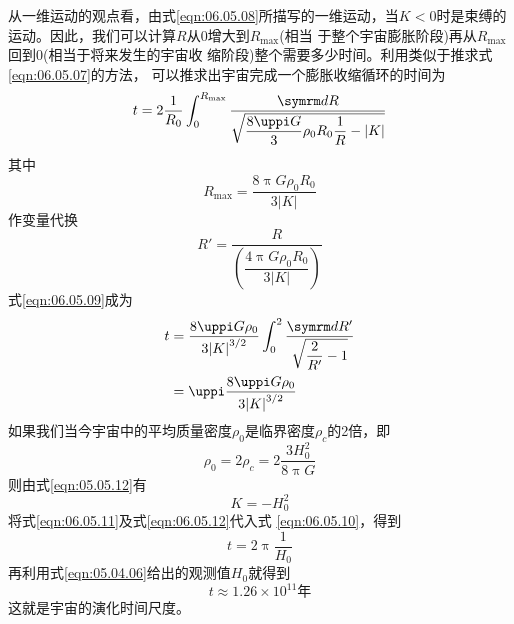 从一维运动的观点看，由式\eqref{eqn:06.05.08}所描写的一维运动，当$ K
  <0 $时是束缚的运动。因此，我们可以计算$ R $从0增大到$ R_{\max} $(相当
于整个宇宙膨胀阶段)再从$ R_{\max} $回到0(相当于将来发生的宇宙收
缩阶段)整个需要多少时间。利用类似于推求式\eqref{eqn:06.05.07}的方法，
可以推求出宇宙完成一个膨胀收缩循环的时间为
\begin{equation}\label{eqn:06.05.09}
  t = 2 \frac { 1 } { R _ { 0 } } \int _ 0 ^ { R _ { \max } } \frac { \dif R } { \sqrt { \dfrac { 8 \uppi G } { 3 } \rho _ { 0 } R _ { 0 } \dfrac { 1 } { R } - | K | } }
\end{equation}
其中
\begin{equation*}
  R _ { \max } = \frac { 8 \uppi G \rho _ { 0 } R _ { 0 } } { 3 | K | }
\end{equation*}
作变量代换
\begin{equation*}
  R ' = \frac { R } { \left( \dfrac { 4 \uppi G \rho _ { 0 } R _ { 0 } } { 3 | K | } \right) }
\end{equation*}
式\eqref{eqn:06.05.09}成为
\begin{equation}\label{eqn:06.05.10}
  \begin{aligned}
    t & = \frac { 8 \uppi G \rho _ { 0 } } { 3 { | K | } ^ { 3 / 2 } } \int _ { 0 } ^ { 2 } \frac { \dif R ' } { \sqrt { \dfrac { 2 } { R ' } - 1 } } \\
      & = \uppi \frac { 8 \uppi G \rho _ { 0 } } { 3 { | K | } ^ { 3 / 2 } }
  \end{aligned}
\end{equation}
如果我们当今宇宙中的平均质量密度$ \rho _ 0 $是临界密度$ \rho _ c $的2倍，即
\begin{equation}\label{eqn:06.05.11}
  \rho _ { 0 } = 2 \rho _ { c } = 2 \frac { 3 H _ 0 ^ { 2 } } { 8 \uppi G }
\end{equation}
则由式\eqref{eqn:05.05.12}有
\begin{equation}\label{eqn:06.05.12}
  K = - H _ { 0 } ^ { 2 }
\end{equation}
将式\eqref{eqn:06.05.11}及式\eqref{eqn:06.05.12}代入式 \eqref{eqn:06.05.10}，得到
\begin{equation}\label{eqn:06.05.13}
  t = 2 \uppi \frac { 1 } { H _ { 0 } }
\end{equation}
再利用式\eqref{eqn:05.04.06}给出的观测值$ H _ { 0 } $就得到
\begin{equation*}
  t \approx 1.26 \times 10 ^ { 11 } \text{年}
\end{equation*}
这就是宇宙的演化时间尺度。
